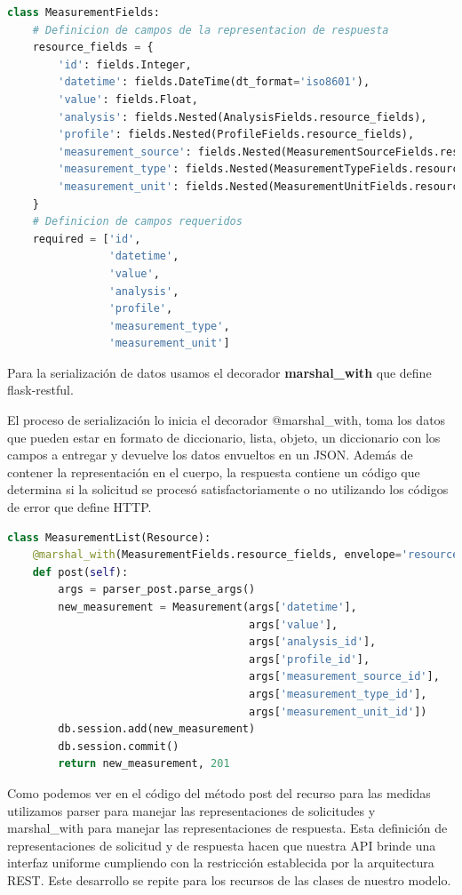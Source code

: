 \begin{lstlisting}[language=Python]
class MeasurementFields:
    # Definicion de campos de la representacion de respuesta
    resource_fields = {
        'id': fields.Integer,
        'datetime': fields.DateTime(dt_format='iso8601'),
        'value': fields.Float,
        'analysis': fields.Nested(AnalysisFields.resource_fields),
        'profile': fields.Nested(ProfileFields.resource_fields),
        'measurement_source': fields.Nested(MeasurementSourceFields.resource_fields),
        'measurement_type': fields.Nested(MeasurementTypeFields.resource_fields),
        'measurement_unit': fields.Nested(MeasurementUnitFields.resource_fields),
    }
    # Definicion de campos requeridos
    required = ['id',
                'datetime',
                'value',
                'analysis',
                'profile',
                'measurement_type',
                'measurement_unit']
\end{lstlisting}

Para la serialización de datos usamos el decorador \textbf{marshal\_with} que define flask-restful.

El proceso de serialización lo inicia el decorador @marshal\_with, toma los datos que pueden estar en formato de diccionario, lista, objeto, un diccionario con los campos a entregar y devuelve los datos envueltos en un JSON. Además de contener la representación en el cuerpo, la respuesta contiene un código que determina si la solicitud se procesó satisfactoriamente o no utilizando los códigos de error que define HTTP.

\begin{lstlisting}[language=Python]
class MeasurementList(Resource):
    @marshal_with(MeasurementFields.resource_fields, envelope='resource')
    def post(self):
        args = parser_post.parse_args()
        new_measurement = Measurement(args['datetime'],
                                      args['value'],
                                      args['analysis_id'],
                                      args['profile_id'],
                                      args['measurement_source_id'],
                                      args['measurement_type_id'],
                                      args['measurement_unit_id'])
        db.session.add(new_measurement)
        db.session.commit()
        return new_measurement, 201
\end{lstlisting}

 Como podemos ver en el código del método post del recurso para las medidas utilizamos parser para manejar las representaciones de solicitudes y marshal\_with para manejar las representaciones de respuesta. Esta definición de representaciones de solicitud y de respuesta hacen que nuestra API brinde una interfaz uniforme cumpliendo con la restricción establecida por la arquitectura REST. 
 Este desarrollo se repite para los recursos de las clases de nuestro modelo.

